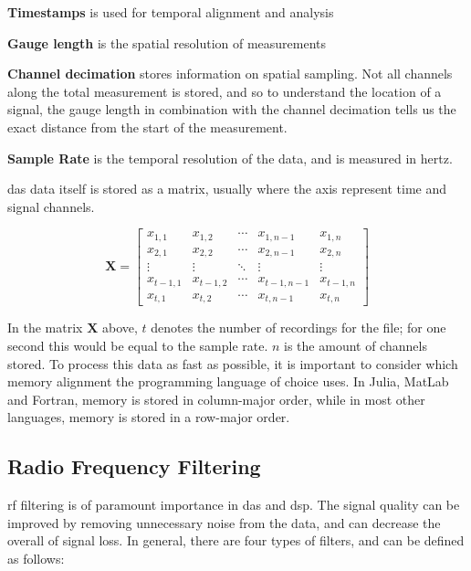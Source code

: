 \textbf{Timestamps} is used for temporal alignment and analysis

\textbf{Gauge length} is the spatial resolution of measurements

\textbf{Channel decimation} stores information on spatial sampling. Not all channels along the total measurement is stored, and so to understand the location of a signal, the gauge length in combination with the channel decimation tells us the exact distance from the start of the measurement.

\textbf{Sample Rate} is the temporal resolution of the data, and is measured in hertz.

\acrshort{das} data itself is stored as a matrix, usually where the axis represent time and signal channels.

\begin{table}[!h]
\centering
\begin{equation*}
\mathbf{X} = \begin{bmatrix}
x_{1,1} & x_{1,2} & \cdots & x_{1,n-1} & x_{1,n} \\
x_{2,1} & x_{2,2} & \cdots & x_{2,n-1} & x_{2,n} \\
\vdots & \vdots & \ddots & \vdots & \vdots \\
x_{t-1,1} & x_{t-1,2} & \cdots & x_{t-1,n-1} & x_{t-1,n} \\
x_{t,1} & x_{t,2} & \cdots & x_{t,n-1} & x_{t,n}
\end{bmatrix}
\end{equation*}
\label{fig:dasmatrix}
\end{table}

In the matrix $\textbf{X}$ above, $t$ denotes the number of recordings for the file; for one second this would be equal to the sample rate. $n$ is the amount of channels stored. To process this data as fast as possible, it is important to consider which memory alignment the programming language of choice uses. In Julia, MatLab and Fortran, memory is stored in column-major order, while in most other languages, memory is stored in a row-major order. 

\subsection{Radio Frequency Filtering}

\acrfull{rf} filtering is of paramount importance in \acrshort{das} and \acrfull{dsp}. The signal quality can be improved by removing unnecessary noise from the data, and can decrease the overall of signal loss. In general, there are four types of filters, and can be defined as follows:

